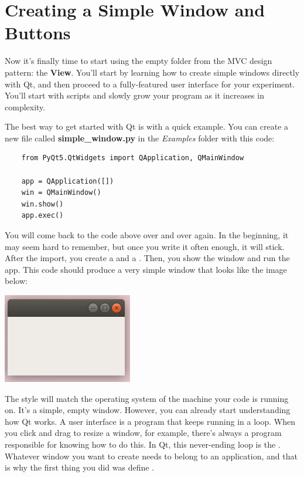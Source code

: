 
\section{Creating a Simple Window and Buttons}\label{sec:simple-window-andbuttons}
Now it's finally time to start using the empty folder from the MVC design pattern: the \textbf{View}. You'll start by learning how to create simple windows directly with Qt, and then proceed to a fully-featured user interface for your experiment. You'll start with scripts and slowly grow your program as it increases in complexity.

The best way to get started with Qt is with a quick example. You can create a new file called \textbf{simple\_window.py} in the \emph{Examples} folder with this code:

\begin{verbatim}
    from PyQt5.QtWidgets import QApplication, QMainWindow

    app = QApplication([])
    win = QMainWindow()
    win.show()
    app.exec()
\end{verbatim}

You will come back to the code above over and over again. In the beginning, it may seem hard to remember, but once you write it often enough, it will stick. After the import, you create a  and a . Then, you show the window and run the app. This code should produce a very simple window that looks like the image below:

\begin{center}
    \includegraphics[width=.3\textwidth]{images/Chapter_08/01_simple_window.png}
\end{center}

The style will match the operating system of the machine your code is running on. It's a simple, empty window. However, you can already start understanding how Qt works. A user interface is a program that keeps running in a loop. When you click and drag to resize a window, for example, there's always a program responsible for knowing how to do this. In Qt, this never-ending loop is the . Whatever window you want to create needs to belong to an application, and that is why the first thing you did was define .

